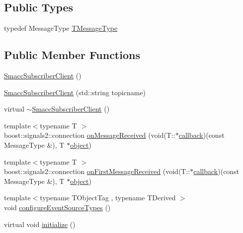 \subsection*{Public Types}
\begin{DoxyCompactItemize}
\item 
typedef Message\+Type \hyperlink{classsmacc_1_1client__bases_1_1SmaccSubscriberClient_a61d798bda71bf335d72e61928ca561b0}{T\+Message\+Type}
\end{DoxyCompactItemize}
\subsection*{Public Member Functions}
\begin{DoxyCompactItemize}
\item 
\hyperlink{classsmacc_1_1client__bases_1_1SmaccSubscriberClient_a9c3dd9981beb495a0646667acae06d73}{Smacc\+Subscriber\+Client} ()
\item 
\hyperlink{classsmacc_1_1client__bases_1_1SmaccSubscriberClient_a7e739a204fe5fe5b8cd7542758555e45}{Smacc\+Subscriber\+Client} (std\+::string topicname)
\item 
virtual \hyperlink{classsmacc_1_1client__bases_1_1SmaccSubscriberClient_a91b9206c97b4acc76d4202639d24a53b}{$\sim$\+Smacc\+Subscriber\+Client} ()
\item 
{\footnotesize template$<$typename T $>$ }\\boost\+::signals2\+::connection \hyperlink{classsmacc_1_1client__bases_1_1SmaccSubscriberClient_a4f02251e3a161fb6d802b154b1081f18}{on\+Message\+Received} (void(T\+::$\ast$\hyperlink{3_2servers_2opencv__perception__node_2opencv__perception__node_8cpp_a050e697bd654facce10ea3f6549669b3}{callback})(const Message\+Type \&), T $\ast$\hyperlink{classobject}{object})
\item 
{\footnotesize template$<$typename T $>$ }\\boost\+::signals2\+::connection \hyperlink{classsmacc_1_1client__bases_1_1SmaccSubscriberClient_a3f6dc8ef86f21f401204182778cc584d}{on\+First\+Message\+Received} (void(T\+::$\ast$\hyperlink{3_2servers_2opencv__perception__node_2opencv__perception__node_8cpp_a050e697bd654facce10ea3f6549669b3}{callback})(const Message\+Type \&), T $\ast$\hyperlink{classobject}{object})
\item 
{\footnotesize template$<$typename T\+Object\+Tag , typename T\+Derived $>$ }\\void \hyperlink{classsmacc_1_1client__bases_1_1SmaccSubscriberClient_adf0e61d4a0b34ecc76fb9f4c3d04ef97}{configure\+Event\+Source\+Types} ()
\item 
virtual void \hyperlink{classsmacc_1_1client__bases_1_1SmaccSubscriberClient_af188f0f5e89de26a07e1f964cdd23a70}{initialize} ()
\end{DoxyCompactItemize}
